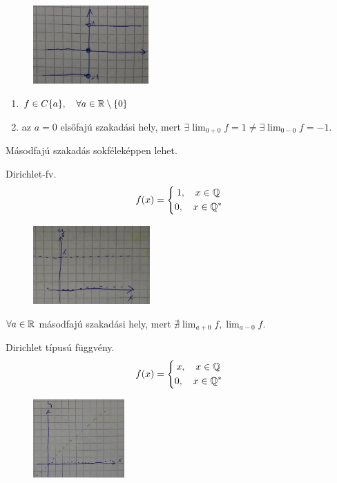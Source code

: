 \documentclass[a4paper,11.5pt]{article}
\begin{document}
\begin{revision}
\begin{example}
			\begin{figure}[H]
				\centering
				\includegraphics[height=3cm]{kepek/03ea_2.jpg}
				\caption{}\label{}
			\end{figure}
			\begin{enumerate}
				\item $f\in C\{a\}, \quad \forall a\in\mathbb{R}\setminus\{0\}$
				\item az $a=0$ elsőfajú szakadási hely, mert \quad $\displaystyle \exists \lim_{0+0}f=1\not=\exists\lim_{0-0}f=-1$.
			\end{enumerate}
		\end{example}
		\begin{note}
			Másodfajú szakadás sokféleképpen lehet.
			\begin{example}
				Dirichlet-fv.
				\[ f(x)=\left\{\begin{gathered}
				1,\quad x\in\mathbb{Q}\\
				0,\quad x\in\mathbb{Q}^*
				\end{gathered}\right. \]
				\begin{figure}[H]
					\centering
					\includegraphics[height=3cm]{kepek/03ea_3.jpg}
					\caption{}\label{}
				\end{figure}
				$\forall a\in \mathbb{R}$ másodfajú szakadási hely, mert $\displaystyle \nexists\lim_{a+0}f,\lim_{a-0}f$.
			\end{example}
			\begin{example}
				Dirichlet típusú függvény.
				\[ f(x)=\left\{\begin{gathered}
				x,\quad x\in\mathbb{Q}\\
				0,\quad x\in\mathbb{Q}^*
				\end{gathered}\right. \]
				\begin{figure}[H]
					\centering
					\includegraphics[height=3cm]{kepek/03ea_4.jpg}

\end{figure}
\end{example}
\end{note}
\end{revision}
\end{document}
